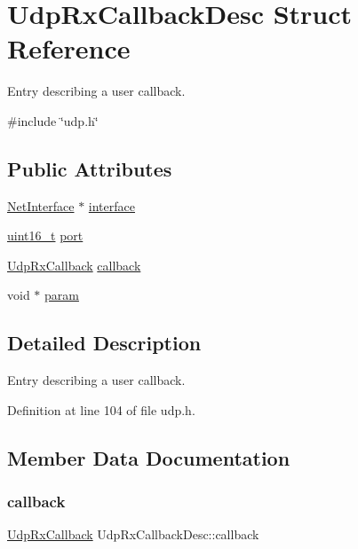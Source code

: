 \hypertarget{structUdpRxCallbackDesc}{}\section{Udp\+Rx\+Callback\+Desc Struct Reference}
\label{structUdpRxCallbackDesc}


Entry describing a user callback.  




{\ttfamily \#include \char`\"{}udp.\+h\char`\"{}}

\subsection*{Public Attributes}
\begin{DoxyCompactItemize}
\item 
\hyperlink{net_8h_a2234db8911a1148c9159979d8f5e0d6b}{Net\+Interface} $\ast$ \hyperlink{structUdpRxCallbackDesc_a686b2abba991578f9841a3cd6e75ca10}{interface}
\item 
\hyperlink{stdint_8h_a273cf69d639a59973b6019625df33e30}{uint16\+\_\+t} \hyperlink{structUdpRxCallbackDesc_a4c9f42715adbf7832647d1950846e61d}{port}
\item 
\hyperlink{udp_8h_a44f4479a46efe22380138b8afca8413c}{Udp\+Rx\+Callback} \hyperlink{structUdpRxCallbackDesc_ad50e5f2634cd97ee825310fa484ed345}{callback}
\item 
void $\ast$ \hyperlink{structUdpRxCallbackDesc_ab7ba8c4493339f103e1621aa28cbcf7d}{param}
\end{DoxyCompactItemize}


\subsection{Detailed Description}
Entry describing a user callback. 

Definition at line 104 of file udp.\+h.



\subsection{Member Data Documentation}
\mbox{\label{structUdpRxCallbackDesc_ad50e5f2634cd97ee825310fa484ed345}} 
\subsubsection{\texorpdfstring{callback}{callback}}
{\footnotesize\ttfamily \hyperlink{udp_8h_a44f4479a46efe22380138b8afca8413c}{Udp\+Rx\+Callback} Udp\+Rx\+Callback\+Desc\+::callback}



